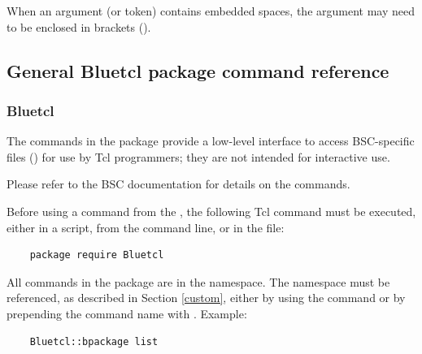 When an argument (or token) contains embedded spaces, the argument may
need to be enclosed in brackets (\te{\{ \}}).



\subsection{General Bluetcl package command reference}


\subsubsection{Bluetcl}

The commands in the  package
provide a low-level interface to access BSC-specific files
() for use by Tcl programmers; they are not intended
for interactive use.  

Please refer to the BSC documentation for details on the
 commands.

Before using a command from the ,  the
following Tcl command must  be executed, either in a script, 
from the command line, or in the  file:
\begin{verbatim}
    package require Bluetcl
\end{verbatim}

All commands in the  package are in the  
namespace.  The namespace must be referenced, as described in Section
\ref{custom}, either by using the  command or by
prepending the command name with .  Example:
\begin{verbatim}
    Bluetcl::bpackage list
\end{verbatim}


